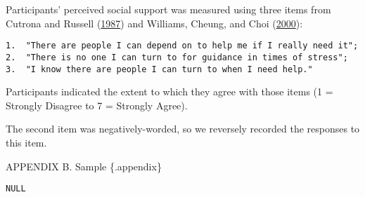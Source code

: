 \documentclass[
  singlecolumn]{report}
\begin{document}
Participants' perceived social support was measured using three items
from Cutrona and Russell (\protect\hyperlink{ref-cutrona1987}{1987}) and
Williams, Cheung, and Choi
(\protect\hyperlink{ref-williams_cyberostracism_2000}{2000}):

\begin{verbatim}
1.  "There are people I can depend on to help me if I really need it";
2.  "There is no one I can turn to for guidance in times of stress";
3.  "I know there are people I can turn to when I need help." 
\end{verbatim}

Participants indicated the extent to which they agree with those items
(1 = Strongly Disagree to 7 = Strongly Agree).

The second item was negatively-worded, so we reversely recorded the
responses to this item.

\newpage{}

APPENDIX B. Sample \{.appendix\}

\begin{verbatim}
NULL
\end{verbatim}
\end{document}
